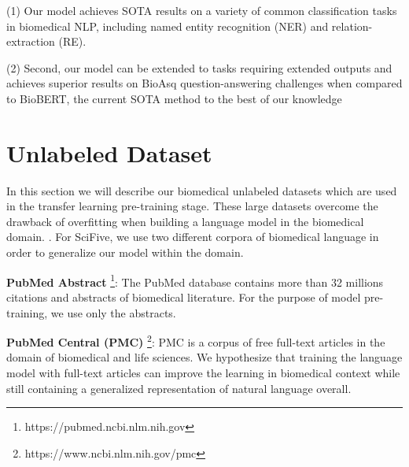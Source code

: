 \documentclass[nocrop]{bioinfo}
\begin{document}
(1) Our model achieves SOTA results on a variety of common classification tasks in biomedical NLP, including named entity recognition (NER) and relation-extraction (RE). 
 
 (2) Second, our model can be extended to tasks requiring extended outputs and achieves superior results on BioAsq question-answering challenges when compared to BioBERT, the current SOTA method to the best of our knowledge \citep{DBLP:journals/corr/abs-1901-08746} 
\section{Unlabeled Dataset}
In this section we will describe our biomedical unlabeled datasets which are used in the transfer learning pre-training stage. These large datasets overcome the drawback of overfitting when building a language model in the biomedical domain.  \citep{DBLP:journals/corr/Ruder17a}. For SciFive, we use two different corpora of biomedical language in order to generalize our model within the domain.


\textbf{PubMed Abstract} \footnote{https://pubmed.ncbi.nlm.nih.gov}: The PubMed database contains more than 32 millions citations and abstracts of biomedical literature. For the purpose of model pre-training, we use only the abstracts.

\textbf{PubMed Central (PMC)} \footnote{https://www.ncbi.nlm.nih.gov/pmc}: PMC is a corpus of free full-text articles in the domain of biomedical and life sciences. We hypothesize that training the language model with full-text articles can improve the learning in biomedical context while still containing a generalized representation of natural language overall. 
\end{document}
